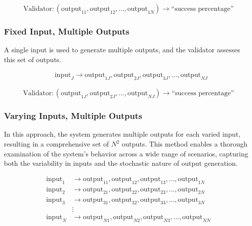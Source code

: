 \documentclass{article}
\begin{document}
\begin{equation*}
\text{Validator}: (\text{output}_{11}, \text{output}_{12}, \ldots, \text{output}_{1N}) \rightarrow \text{``success percentage''}
\end{equation*}

\subsubsection{Fixed Input, Multiple Outputs}
A single input is used to generate multiple outputs, and the validator assesses this set of outputs.

\begin{equation*}
\begin{aligned}
&\text{input}_J \rightarrow \text{output}_{1J}, \text{output}_{2J}, \text{output}_{3J}, \ldots, \text{output}_{NJ}
\end{aligned}
\end{equation*}

\begin{equation*}
\text{Validator}: (\text{output}_{1J}, \text{output}_{2J}, \ldots, \text{output}_{NJ}) \rightarrow \text{``success percentage''}
\end{equation*}

\subsubsection{Varying Inputs, Multiple Outputs}

In this approach, the system generates multiple outputs for each varied input, resulting in a comprehensive set of \( N^2 \) outputs. This method enables a thorough examination of the system's behavior across a wide range of scenarios, capturing both the variability in inputs and the stochastic nature of output generation.

\begin{equation*}
\begin{aligned}
\text{input}_1 &\rightarrow \text{output}_{11}, \text{output}_{12}, \text{output}_{13}, \ldots, \text{output}_{1N} \\
\text{input}_2 &\rightarrow \text{output}_{21}, \text{output}_{22}, \text{output}_{23}, \ldots, \text{output}_{2N} \\
\text{input}_3 &\rightarrow \text{output}_{31}, \text{output}_{32}, \text{output}_{33}, \ldots, \text{output}_{3N} \\
&\vdots \\
\text{input}_N &\rightarrow \text{output}_{N1}, \text{output}_{N2}, \text{output}_{N3}, \ldots, \text{output}_{NN}
\end{aligned}
\end{equation*}
\end{document}
